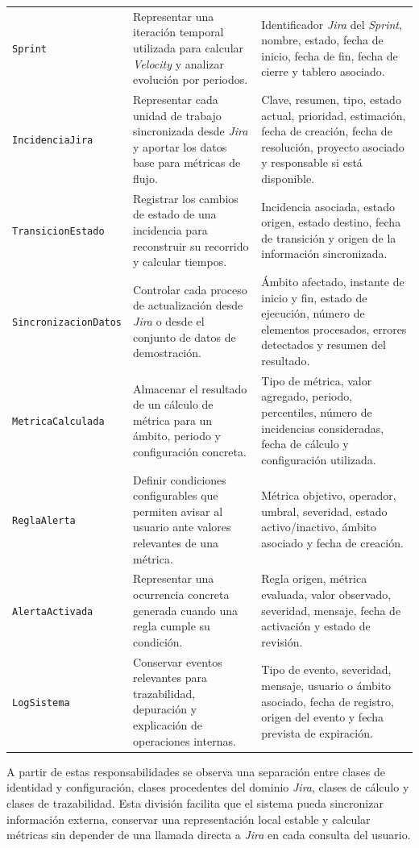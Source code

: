 \begin{landscape}
{\begin{longtable}{>{\raggedright\arraybackslash}p{4.6cm}>{\raggedright\arraybackslash}p{7.6cm}>{\raggedright\arraybackslash}p{9.8cm}}
\texttt{Sprint} & Representar una iteración temporal utilizada para calcular \textit{Velocity} y analizar evolución por periodos. & Identificador \textit{Jira} del \textit{Sprint}, nombre, estado, fecha de inicio, fecha de fin, fecha de cierre y tablero asociado. \\
\texttt{IncidenciaJira} & Representar cada unidad de trabajo sincronizada desde \textit{Jira} y aportar los datos base para métricas de flujo. & Clave, resumen, tipo, estado actual, prioridad, estimación, fecha de creación, fecha de resolución, proyecto asociado y responsable si está disponible. \\
\texttt{TransicionEstado} & Registrar los cambios de estado de una incidencia para reconstruir su recorrido y calcular tiempos. & Incidencia asociada, estado origen, estado destino, fecha de transición y origen de la información sincronizada. \\
\texttt{SincronizacionDatos} & Controlar cada proceso de actualización desde \textit{Jira} o desde el conjunto de datos de demostración. & Ámbito afectado, instante de inicio y fin, estado de ejecución, número de elementos procesados, errores detectados y resumen del resultado. \\
\texttt{MetricaCalculada} & Almacenar el resultado de un cálculo de métrica para un ámbito, periodo y configuración concreta. & Tipo de métrica, valor agregado, periodo, percentiles, número de incidencias consideradas, fecha de cálculo y configuración utilizada. \\
\texttt{ReglaAlerta} & Definir condiciones configurables que permiten avisar al usuario ante valores relevantes de una métrica. & Métrica objetivo, operador, umbral, severidad, estado activo/inactivo, ámbito asociado y fecha de creación. \\
\texttt{AlertaActivada} & Representar una ocurrencia concreta generada cuando una regla cumple su condición. & Regla origen, métrica evaluada, valor observado, severidad, mensaje, fecha de activación y estado de revisión. \\
\texttt{LogSistema} & Conservar eventos relevantes para trazabilidad, depuración y explicación de operaciones internas. & Tipo de evento, severidad, mensaje, usuario o ámbito asociado, fecha de registro, origen del evento y fecha prevista de expiración. \\
\end{longtable}
}
\end{landscape}

A partir de estas responsabilidades se observa una separación entre clases de identidad y configuración, clases procedentes del dominio \textit{Jira}, clases de cálculo y clases de trazabilidad. Esta división facilita que el sistema pueda sincronizar información externa, conservar una representación local estable y calcular métricas sin depender de una llamada directa a \textit{Jira} en cada consulta del usuario.

